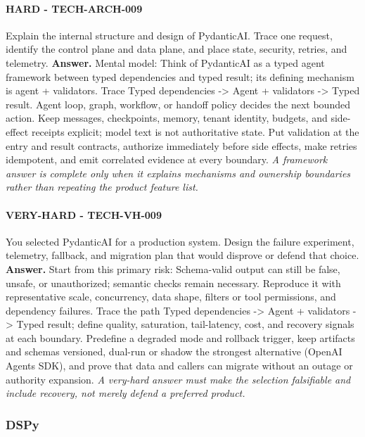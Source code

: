 \paragraph{HARD - TECH-ARCH-009} Explain the internal structure and design of PydanticAI. Trace one request, identify the control plane and data plane, and place state, security, retries, and telemetry.
\textbf{Answer.} Mental model: Think of PydanticAI as a typed agent framework between typed dependencies and typed result; its defining mechanism is agent + validators. Trace Typed dependencies -> Agent + validators -> Typed result. Agent loop, graph, workflow, or handoff policy decides the next bounded action. Keep messages, checkpoints, memory, tenant identity, budgets, and side-effect receipts explicit; model text is not authoritative state. Put validation at the entry and result contracts, authorize immediately before side effects, make retries idempotent, and emit correlated evidence at every boundary.
\textit{A framework answer is complete only when it explains mechanisms and ownership boundaries rather than repeating the product feature list.}
\paragraph{VERY-HARD - TECH-VH-009} You selected PydanticAI for a production system. Design the failure experiment, telemetry, fallback, and migration plan that would disprove or defend that choice.
\textbf{Answer.} Start from this primary risk: Schema-valid output can still be false, unsafe, or unauthorized; semantic checks remain necessary. Reproduce it with representative scale, concurrency, data shape, filters or tool permissions, and dependency failures. Trace the path Typed dependencies -> Agent + validators -> Typed result; define quality, saturation, tail-latency, cost, and recovery signals at each boundary. Predefine a degraded mode and rollback trigger, keep artifacts and schemas versioned, dual-run or shadow the strongest alternative (OpenAI Agents SDK), and prove that data and callers can migrate without an outage or authority expansion.
\textit{A very-hard answer must make the selection falsifiable and include recovery, not merely defend a preferred product.}
\subsubsection*{DSPy}
